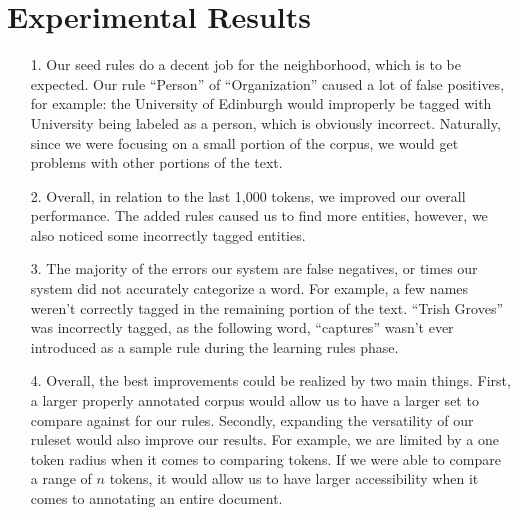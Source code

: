 \documentclass[titlepage]{article}
\begin{document}
	\section{Experimental Results}\label{sec:experimental_results}
\begin{itemize}
		
	\item[1.] Our seed rules do a decent job for the neighborhood, which is to be expected. Our rule ``Person'' of ``Organization'' caused a lot of false positives, for example: the University of Edinburgh would improperly be tagged with University being labeled as a person, which is obviously incorrect. Naturally, since we were focusing on a small portion of the corpus, we would get problems with other portions of the text.
	
	\item[2.] Overall, in relation to the last 1,000 tokens, we improved our overall performance. The added rules caused us to find more entities, however, we also noticed some incorrectly tagged entities.
	
	\item[3.] The majority of the errors our system are false negatives, or times our system did not accurately categorize a word. For example, a few names weren't correctly tagged in the remaining portion of the text. ``Trish Groves'' was incorrectly tagged, as the following word, ``captures'' wasn't ever introduced as a sample rule during the learning rules phase.
	
	\item[4.] Overall, the best improvements could be realized by two main things. First, a larger properly annotated corpus would allow us to have a larger set to compare against for our rules. Secondly, expanding the versatility of our ruleset would also improve our results. For example, we are limited by a one token radius when it comes to comparing tokens. If we were able to compare a range of $n$ tokens, it would allow us to have larger accessibility when it comes to annotating an entire document.
\end{itemize}
\end{document}
